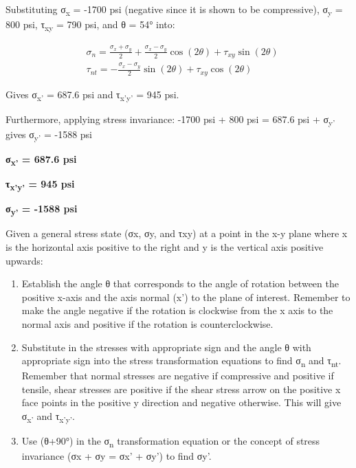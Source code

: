 \documentclass[
  letterpaper,
  DIV=11,
  numbers=noendperiod]{scrreprt}
\theoremstyle{definition}
\theoremstyle{remark}
\begin{document}
\begin{tcolorbox}
\begin{tcolorbox}
Substituting σ\textsubscript{x} = -1700 psi (negative since it is shown
to be compressive), σ\textsubscript{y} = 800 psi, τ\textsubscript{xy} =
790 psi, and θ = 54° into:

\[
\begin{aligned}
& \sigma_n=\frac{\sigma_x+\sigma_y}{2}+\frac{\sigma_x-\sigma_y}{2} \cos (2 \theta)+\tau_{x y} \sin (2 \theta) \\
& \tau_{n t}=-\frac{\sigma_x-\sigma_y}{2} \sin (2 \theta)+\tau_{x y} \cos (2 \theta)
\end{aligned}
\]

Gives σ\textsubscript{x'} = 687.6 psi and τ\textsubscript{x'y'} = 945
psi.

Furthermore, applying stress invariance: -1700 psi + 800 psi = 687.6 psi
+ σ\textsubscript{y'} gives σ\textsubscript{y'} = -1588 psi

\textbf{σ\textsubscript{x'} = 687.6 psi}

\textbf{τ\textsubscript{x'y'} = 945 psi}

\textbf{σ\textsubscript{y'} = -1588 psi}

\end{tcolorbox}

\end{tcolorbox}

\begin{tcolorbox}[enhanced jigsaw, leftrule=.75mm, colbacktitle=quarto-callout-warning-color!10!white, breakable, opacityback=0, colback=white, titlerule=0mm, toprule=.15mm, colframe=quarto-callout-warning-color-frame, coltitle=black, title={Step-by-step: Stress transformation}, toptitle=1mm, bottomrule=.15mm, rightrule=.15mm, left=2mm, arc=.35mm, opacitybacktitle=0.6, bottomtitle=1mm]

Given a general stress state (σx, σy, and τxy) at a point in the x-y
plane where x is the horizontal axis positive to the right and y is the
vertical axis positive upwards:

\begin{enumerate}
\def\labelenumi{\arabic{enumi}.}
\item
  Establish the angle θ that corresponds to the angle of rotation
  between the positive x-axis and the axis normal (x') to the plane of
  interest. Remember to make the angle negative if the rotation is
  clockwise from the x axis to the normal axis and positive if the
  rotation is counterclockwise.
\item
  Substitute in the stresses with appropriate sign and the angle θ with
  appropriate sign into the stress transformation equations to find
  σ\textsubscript{n} and τ\textsubscript{nt}. Remember that normal
  stresses are negative if compressive and positive if tensile, shear
  stresses are positive if the shear stress arrow on the positive x face
  points in the positive y direction and negative otherwise. This will
  give σ\textsubscript{x'} and τ\textsubscript{x'y'}.
\item
  Use (θ+90°) in the σ\textsubscript{n} transformation equation or the
  concept of stress invariance (σx + σy = σx' + σy') to find σy'.
\end{enumerate}

\end{tcolorbox}
\end{document}
